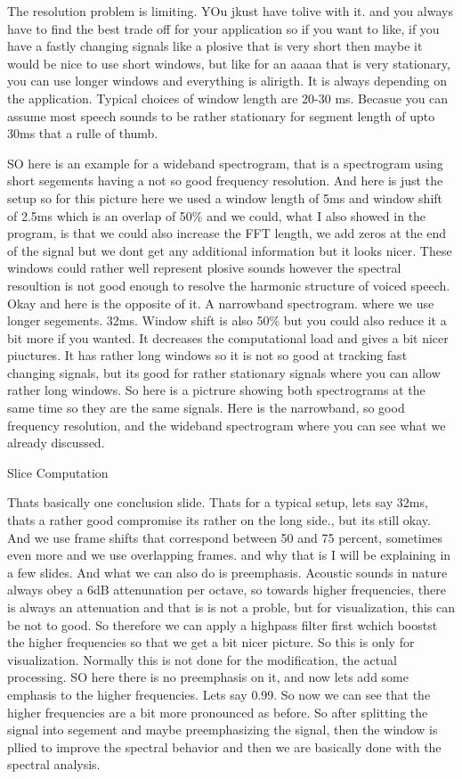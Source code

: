 The resolution problem is limiting. YOu jkust have tolive with it.  and  you always have to find the best trade off for your application so if you want to like, if you have a fastly changing signals like a plosive that is very short then maybe it would be nice to use short windows, but like for an aaaaa that is very stationary, you can use longer windows and everything is alirigth.  It is always depending on the application.  Typical choices of window length are 20-30 ms.  Becasue you can assume most speech sounds to be rather stationary for segment length of upto 30ms that a rulle of thumb.  

SO here is an example for a wideband spectrogram, that is a spectrogram using short segements having a not so good frequency resolution.  And here is just the setup so for this picture here we used a window length of 5ms and window shift of 2.5ms which is an overlap of 50\% and we could, what I also showed in the program, is that we could also increase the FFT length, we add zeros at the end of the signal but we dont get any additional information but it looks nicer. These windows could rather well represent plosive sounds however the spectral resoultion is not good enough to resolve the harmonic structure of voiced speech.  Okay and here is the opposite of it.  A narrowband spectrogram. where we use longer segements. 32ms.  Window shift is also 50\% but you could also reduce it a bit more if you wanted. It decreases the computational load and gives a bit nicer piuctures.  It has rather long windows so it is not so good at tracking fast changing signals, but its good for rather stationary signals where you can allow rather long windows.  So here is a pictrure showing both spectrograms at the same time so they are the same signals.  Here is the narrowband, so good frequency resolution, and the wideband spectrogram where you can see what we already discussed. 


Slice Computation

Thats basically one conclusion slide. Thats for a typical setup, lets say 32ms, thats a rather good compromise its rather on the long side., but its still okay.  And we use frame shifts that correspond between 50 and 75 percent, sometimes even more and we use overlapping frames. and why that is I will be explaining in a few slides. And what we can also do is preemphasis.  Acoustic sounds in nature always obey a 6dB attenunation per octave, so towards higher frequencies, there is always an attenuation and that is is not a proble, but for visualization, this can be not to good. So therefore we can apply a highpass filter first wchich boostst the higher frequencies so that we get a bit nicer picture.  So this is only for visualization.  Normally this is not done for the modification, the actual processing. SO here there is no preemphasis on it, and now lets add some emphasis to the higher frequencies. Lets say 0.99. So now we can see that the higher frequencies are a bit more pronounced as before. 
So after splitting the signal into segement and maybe preemphasizing the signal, then the window is pllied to improve the spectral behavior and then we are basically done with the spectral analysis.
   
